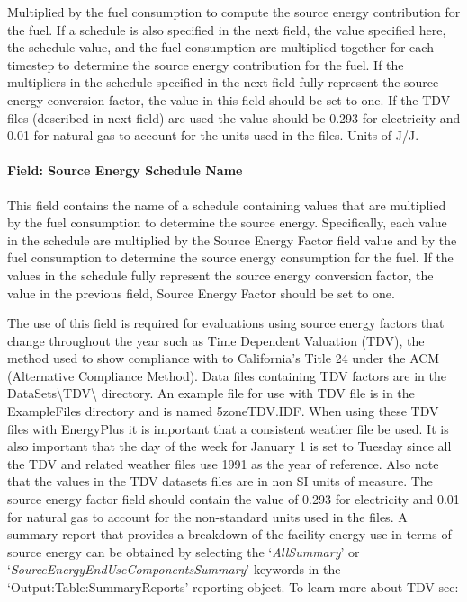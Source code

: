 Multiplied by the fuel consumption to compute the source energy contribution for the fuel. If a schedule is also specified in the next field, the value specified here, the schedule value, and the fuel consumption are multiplied together for each timestep to determine the source energy contribution for the fuel. If the multipliers in the schedule specified in the next field fully represent the source energy conversion factor, the value in this field should be set to one. If the TDV files (described in next field) are used the value should be 0.293 for electricity and 0.01 for natural gas to account for the units used in the files. Units of J/J.

\paragraph{Field: Source Energy Schedule Name}\label{field-source-energy-schedule-name}

This field contains the name of a schedule containing values that are multiplied by the fuel consumption to determine the source energy. Specifically, each value in the schedule are multiplied by the Source Energy Factor field value and by the fuel consumption to determine the source energy consumption for the fuel. If the values in the schedule fully represent the source energy conversion factor, the value in the previous field, Source Energy Factor should be set to one.

The use of this field is required for evaluations using source energy factors that change throughout the year such as Time Dependent Valuation (TDV), the method used to show compliance with to California's Title 24 under the ACM (Alternative Compliance Method). Data files containing TDV factors are in the DataSets\textbackslash{}TDV\textbackslash{} directory. An example file for use with TDV file is in the ExampleFiles directory and is named 5zoneTDV.IDF. When using these TDV files with EnergyPlus it is important that a consistent weather file be used. It is also important that the day of the week for January 1 is set to Tuesday since all the TDV and related weather files use 1991 as the year of reference. Also note that the values in the TDV datasets files are in non SI units of measure. The source energy factor field should contain the value of 0.293 for electricity and 0.01 for natural gas to account for the non-standard units used in the files. A summary report that provides a breakdown of the facility energy use in terms of source energy can be obtained by selecting the `\emph{AllSummary}' or `\emph{SourceEnergyEndUseComponentsSummary}' keywords in the `Output:Table:SummaryReports' reporting object. To learn more about TDV see:

